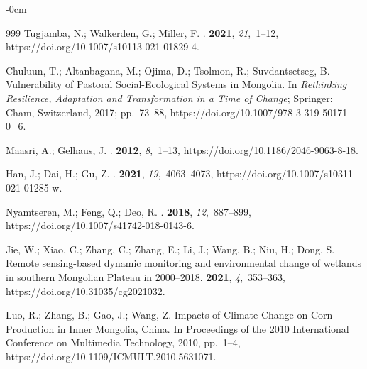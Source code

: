 \documentclass[geosciences,article,accept,pdftex,oneauthor]{Definitions/mdpi}
\begin{document}
\begin{adjustwidth}{-\extralength}{0cm}
\begin{thebibliography}{999}
Tugjamba, N.; Walkerden, G.; Miller, F.
.
 {\bf 2021}, {\em 21},~1--12, https://doi.org/10.1007/s10113-021-01829-4.

Chuluun, T.; Altanbagana, M.; Ojima, D.; Tsolmon, R.; Suvdantsetseg, B.
  {Vulnerability of Pastoral Social-Ecological Systems in Mongolia}.
\newblock In {\em {Rethinking Resilience, Adaptation and Transformation in a
  Time of Change}}; Springer: Cham,  Switzerland, 2017; pp.~73--88, https://doi.org/10.1007/978-3-319-50171-0\_6.

Maasri, A.; Gelhaus, J.
.
 {\bf 2012}, {\em 8},~1--13, https://doi.org/10.1186/2046-9063-8-18.

Han, J.; Dai, H.; Gu, Z.
.
 {\bf 2021}, {\em
  19},~4063--4073, https://doi.org/10.1007/s10311-021-01285-w.

Nyamtseren, M.; Feng, Q.; Deo, R.
.
 {\bf 2018},
  {\em 12},~887--899, https://doi.org/10.1007/s41742-018-0143-6.

Jie, W.; Xiao, C.; Zhang, C.; Zhang, E.; Li, J.; Wang, B.; Niu, H.; Dong, S.
\newblock Remote sensing-based dynamic monitoring and environmental change of
  wetlands in southern Mongolian Plateau in 2000–2018.
 {\bf 2021}, {\em 4},~353--363, https://doi.org/10.31035/cg2021032.

Luo, R.; Zhang, B.; Gao, J.; Wang, Z.
\newblock Impacts of Climate Change on Corn Production in Inner Mongolia,
  China.
\newblock In Proceedings of the 2010 International Conference on Multimedia
  Technology,  2010, pp.~1--4, https://doi.org/10.1109/ICMULT.2010.5631071.


\end{thebibliography}
\end{adjustwidth}
\end{document}
